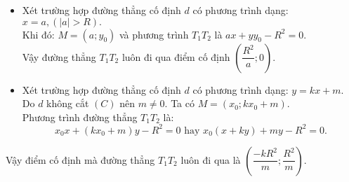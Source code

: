 \begin{bt}
{\begin{enumerate}
			\begin{itemize}
				\item Xét trường hợp đường thẳng cố định $d$ có phương trình dạng: $x=a, \left(|a| > R\right).$\\
				Khi đó: $M=(a;y_0)$ và phương trình $T_1T_2$ là $ax+yy_0-R^2=0$.\\
				Vậy đường thẳng $T_1T_2$ luôn đi qua điểm cố định $\left(\dfrac{R^2}{a};0\right).$
				\item Xét trường hợp đường thẳng cố định $d$ có phương trình dạng: $y=kx+m.$\\
				Do $d$ không cắt $(C)$ nên $m \ne 0$. Ta có $M=(x_0;kx_0+m)$.\\
				Phương trình đường thẳng $T_1T_2$ là:\\ $$x_0x+(kx_0+m)y-R^2=0 \text{ hay }  x_0(x+ky)+my-R^2=0.$$
				
			\end{itemize} 
			Vậy điểm cố định mà đường thẳng $T_1T_2$ luôn đi qua là $\left(\dfrac{-kR^2}{m};\dfrac{R^2}{m}\right).$ \end{enumerate} }
	
\end{bt}


